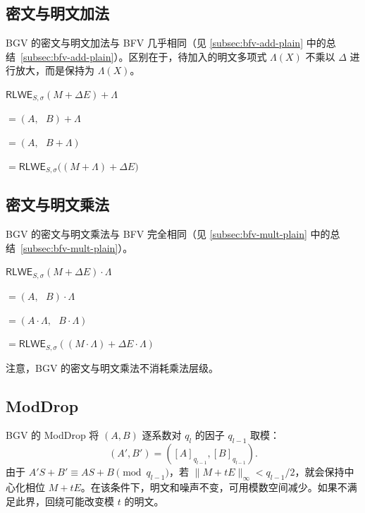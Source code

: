 \subsection{密文与明文加法}
\label{subsec:bgv-add-plain}

BGV 的密文与明文加法与 BFV 几乎相同（见 \autoref{subsec:bfv-add-plain} 中的总结~\ref*{subsec:bfv-add-plain}）。区别在于，待加入的明文多项式 $\Lambda(X)$ 不乘以 $\Delta$ 进行放大，而是保持为 $\Lambda(X)$。

\begin{tcolorbox}[title={\textbf{\tboxlabel{\ref*{subsec:bgv-add-plain}} BGV 密文与明文加法}}]
$\textsf{RLWE}_{S, \sigma}(M + \Delta E) + \Lambda $

$=  (A, \text{ } B) + \Lambda$

$=  (A, \text{ } B + \Lambda)$

$= \textsf{RLWE}_{S, \sigma}\bm((M + \Lambda) + \Delta E \bm)$
\end{tcolorbox}


\subsection{密文与明文乘法}
\label{subsec:bgv-mult-plain}




BGV 的密文与明文乘法与 BFV 完全相同（见 \autoref{subsec:bfv-mult-plain} 中的总结~\ref*{subsec:bfv-mult-plain}）。


\begin{tcolorbox}[title={\textbf{\tboxlabel{\ref*{subsec:bgv-mult-plain}} BGV 密文与明文乘法}}]
$\textsf{RLWE}_{S, \sigma}(M + \Delta E) \cdot \Lambda$

$= (A, \text{ } B) \cdot \Lambda$

$= (A \cdot \Lambda, \text{ }  B \cdot \Lambda )$

$= \textsf{RLWE}_{S, \sigma}((M \cdot \Lambda) + \Delta E\cdot \Lambda )$
\end{tcolorbox}

注意，BGV 的密文与明文乘法不消耗乘法层级。

\subsection{\textsf{ModDrop}}
\label{subsec:bgv-moddrop}

BGV 的 ModDrop 将 $(A,B)$ 逐系数对 $q_l$ 的因子 $q_{l-1}$ 取模：
\[
(A',B')=([A]_{q_{l-1}},[B]_{q_{l-1}}).
\]
由于 $A'S+B'\equiv AS+B\pmod{q_{l-1}}$，若 $\|M+tE\|_\infty<q_{l-1}/2$，就会保持中心化相位 $M+tE$。在该条件下，明文和噪声不变，可用模数空间减少。如果不满足此界，回绕可能改变模 $t$ 的明文。

